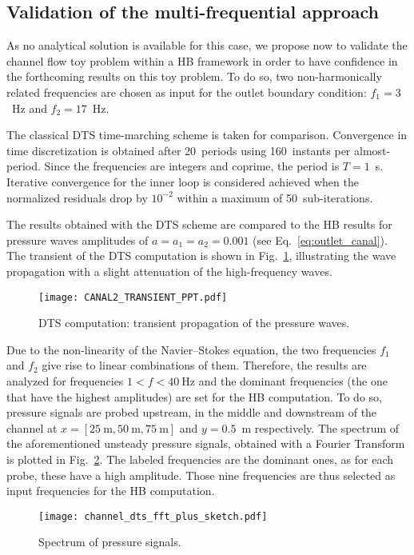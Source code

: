 \subsection{Validation of the multi-frequential approach}
\label{sec:channel_multifreq}

As no analytical solution is available for this case, we propose
now to validate the channel flow toy problem within a HB framework
in order to have confidence in the forthcoming results on this
toy problem.
To do so, two non-harmonically related
frequencies are chosen as input for the outlet boundary condition:
$f_1 = 3$~Hz and $f_2 = 17$~Hz.

The classical DTS time-marching scheme is taken for comparison.
Convergence in time discretization is obtained after 20~periods using
160~instants per almost-period. Since the frequencies are integers and
coprime, the period is $T=1$~s.  Iterative convergence for the
inner loop is considered achieved when the normalized residuals drop
by $10^{-2}$ within a maximum of 50~sub-iterations.

The results obtained with the DTS scheme are compared to the HB
results for pressure waves amplitudes of $a = a_1 = a_2 = 0.001$
(see Eq.~\eqref{eq:outlet_canal}).  The
transient of the DTS computation is shown in
Fig.~\ref{fig:canal2_transient}, illustrating the wave propagation
with a slight attenuation of the high-frequency waves.
\begin{figure}[htp]
  \centering
  \texttt{[image: CANAL2\_TRANSIENT\_PPT.pdf]}
  \caption{DTS computation: transient propagation of the pressure waves.}
  \label{fig:canal2_transient}
\end{figure}

Due to the non-linearity of the Navier--Stokes equation, the two frequencies
$f_1$ and $f_2$ give rise to linear combinations of them.
Therefore, the results are analyzed for frequencies $1<f< 40~\textrm{Hz}$ and the
dominant frequencies (the one that have the highest amplitudes) are
set for the HB computation.  To do so, pressure signals are probed
upstream, in the middle and downstream of the channel at
$x=[25~\textrm{m}, 50~\textrm{m}, 75~\textrm{m}]$ and $y=0.5$~m
respectively.  The spectrum of the aforementioned unsteady pressure
signals, obtained with a Fourier Transform is plotted in
Fig.~\ref{fig:canal2_dts_fft}.  The labeled frequencies are the
dominant ones, as for each probe, these have a high amplitude. Those
nine frequencies are thus selected as input frequencies for the HB computation.
\begin{figure}[htp]
  \centering
  \texttt{[image: channel\_dts\_fft\_plus\_sketch.pdf]}
  \caption{Spectrum of pressure signals.}
  \label{fig:canal2_dts_fft}
\end{figure}

